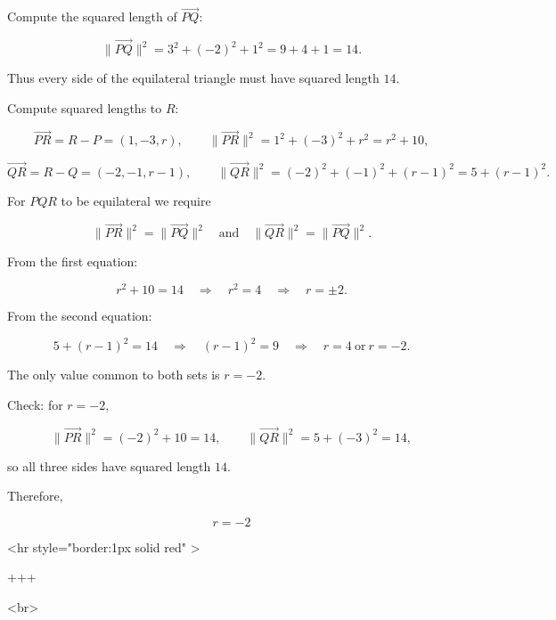 Compute the squared length of $\overrightarrow{PQ}$:

$$
\lVert\overrightarrow{PQ}\rVert^2=3^2+(-2)^2+1^2=9+4+1=14.
$$

Thus every side of the equilateral triangle must have squared length $14$.

Compute squared lengths to $R$:

$$
\overrightarrow{PR}=R-P=(1,-3,r),\qquad
\lVert\overrightarrow{PR}\rVert^2=1^2+(-3)^2+r^2=r^2+10,
$$


$$
\overrightarrow{QR}=R-Q=(-2,-1,r-1),\qquad
\lVert\overrightarrow{QR}\rVert^2=(-2)^2+(-1)^2+(r-1)^2=5+(r-1)^2.
$$

For $PQR$ to be equilateral we require

$$
\lVert\overrightarrow{PR}\rVert^2=\lVert\overrightarrow{PQ}\rVert^2
\quad\text{and}\quad
\lVert\overrightarrow{QR}\rVert^2=\lVert\overrightarrow{PQ}\rVert^2.
$$

From the first equation:

$$
r^2+10=14 \quad\Longrightarrow\quad r^2=4 \quad\Longrightarrow\quad r=\pm 2.
$$

From the second equation:

$$
5+(r-1)^2=14 \quad\Longrightarrow\quad (r-1)^2=9 \quad\Longrightarrow\quad r=4\ \text{or}\ r=-2.
$$

The only value common to both sets is $r=-2$.

Check: for $r=-2$,

$$
\lVert\overrightarrow{PR}\rVert^2 = (-2)^2+10=14,\qquad
\lVert\overrightarrow{QR}\rVert^2 = 5+(-3)^2=14,
$$

so all three sides have squared length $14$.

Therefore,

$$
r=-2
$$

<hr style="border:1px solid red" >

+++

<br>

